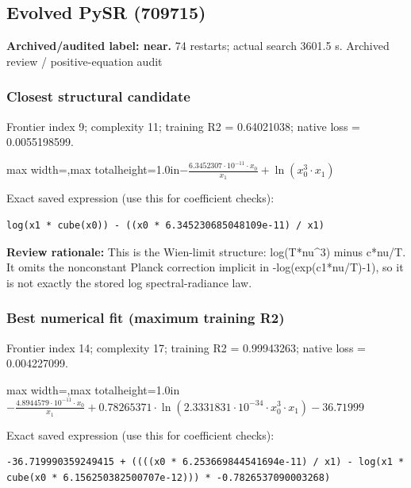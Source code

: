 \documentclass[10pt,letterpaper,landscape]{article}
\begin{document}
\begin{minipage}[t]{0.485\textwidth}
\subsection*{Evolved PySR (709715)}
\textbf{Archived/audited label: near.} 74 restarts; actual search 3601.5 s.
{\small Archived review / positive-equation audit}
\subsubsection*{Closest structural candidate}
Frontier index 9; complexity 11; training R2 = 0.64021038; native loss = 0.0055198599.
\begin{center}\begin{adjustbox}{max width=\linewidth,max totalheight=1.0in}$\displaystyle - \frac{6.3452307 \cdot 10^{-11} \cdot x_{0}}{x_{1}} + \ln{\left(x_{0}^{3} \cdot x_{1} \right)}$\end{adjustbox}\end{center}
{\scriptsize Exact saved expression (use this for coefficient checks):}
\begin{lstlisting}
log(x1 * cube(x0)) - ((x0 * 6.345230685048109e-11) / x1)
\end{lstlisting}
{\small\textbf{Review rationale:} This is the Wien-limit structure: log(T*nu\textasciicircum{}3) minus c*nu/T. It omits the nonconstant Planck correction implicit in -log(exp(c1*nu/T)-1), so it is not exactly the stored log spectral-radiance law.}
\subsubsection*{Best numerical fit (maximum training R2)}
Frontier index 14; complexity 17; training R2 = 0.99943263; native loss = 0.004227099.
\begin{center}\begin{adjustbox}{max width=\linewidth,max totalheight=1.0in}$\displaystyle - \frac{4.8944579 \cdot 10^{-11} \cdot x_{0}}{x_{1}} + 0.78265371 \cdot \ln{\left(2.3331831 \cdot 10^{-34} \cdot x_{0}^{3} \cdot x_{1} \right)} - 36.71999$\end{adjustbox}\end{center}
{\scriptsize Exact saved expression (use this for coefficient checks):}
\begin{lstlisting}
-36.719990359249415 + ((((x0 * 6.253669844541694e-11) / x1) - log(x1 * cube(x0 * 6.156250382500707e-12))) * -0.7826537090003268)
\end{lstlisting}
\end{minipage}
\clearpage{}\label{planck-10009}
\end{document}
